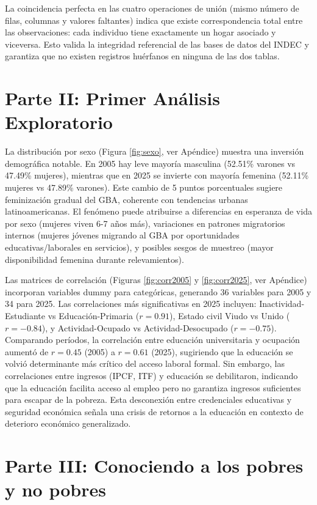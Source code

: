 \documentclass[11pt,a4paper]{article}
\begin{document}
La coincidencia perfecta en las cuatro operaciones de unión (mismo número de filas, columnas y valores faltantes) indica que existe correspondencia total entre las observaciones: cada individuo tiene exactamente un hogar asociado y viceversa. Esto valida la integridad referencial de las bases de datos del INDEC y garantiza que no existen registros huérfanos en ninguna de las dos tablas.

\section{Parte II: Primer Análisis Exploratorio}

La distribución por sexo (Figura \ref{fig:sexo}, ver Apéndice) muestra una inversión demográfica notable. En 2005 hay leve mayoría masculina (52.51\% varones vs 47.49\% mujeres), mientras que en 2025 se invierte con mayoría femenina (52.11\% mujeres vs 47.89\% varones). Este cambio de 5 puntos porcentuales sugiere feminización gradual del GBA, coherente con tendencias urbanas latinoamericanas. El fenómeno puede atribuirse a diferencias en esperanza de vida por sexo (mujeres viven 6-7 años más), variaciones en patrones migratorios internos (mujeres jóvenes migrando al GBA por oportunidades educativas/laborales en servicios), y posibles sesgos de muestreo (mayor disponibilidad femenina durante relevamientos).

Las matrices de correlación (Figuras \ref{fig:corr2005} y \ref{fig:corr2025}, ver Apéndice) incorporan variables dummy para categóricas, generando 36 variables para 2005 y 34 para 2025. Las correlaciones más significativas en 2025 incluyen: Inactividad-Estudiante vs Educación-Primaria ($r = 0.91$), Estado civil Viudo vs Unido ($r = -0.84$), y Actividad-Ocupado vs Actividad-Desocupado ($r = -0.75$). Comparando períodos, la correlación entre educación universitaria y ocupación aumentó de $r = 0.45$ (2005) a $r = 0.61$ (2025), sugiriendo que la educación se volvió determinante más crítico del acceso laboral formal. Sin embargo, las correlaciones entre ingresos (IPCF, ITF) y educación se debilitaron, indicando que la educación facilita acceso al empleo pero no garantiza ingresos suficientes para escapar de la pobreza. Esta desconexión entre credenciales educativas y seguridad económica señala una crisis de retornos a la educación en contexto de deterioro económico generalizado.

\section{Parte III: Conociendo a los pobres y no pobres}
\end{document}
